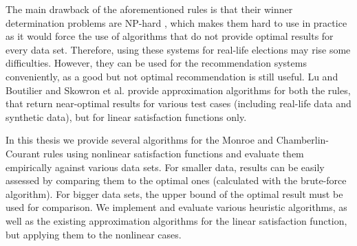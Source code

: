 The main drawback of the aforementioned rules is that their winner determination problems are NP-hard \cite{3, 4, 2}, which makes them hard to use in practice as it would force the use of algorithms that do not provide optimal results for every data set. Therefore, using these systems for real-life elections may rise some difficulties. However, they can be used for the recommendation systems conveniently, as a good but not optimal recommendation is still useful. Lu and Boutilier \cite{4} and Skowron et al. \cite{1} provide approximation algorithms for both the rules, that return near-optimal results for various test cases (including real-life data and synthetic data), but for linear satisfaction functions only.

In this thesis we provide several algorithms for the Monroe and Chamberlin-Courant rules using nonlinear satisfaction functions and evaluate them empirically against various data sets. For smaller data, results can be easily assessed by comparing them to the optimal ones (calculated with the brute-force algorithm). For bigger data sets, the upper bound of the optimal result must be used for comparison. We implement and evaluate various heuristic algorithms, as well as the existing approximation algorithms for the linear satisfaction function, but applying them to the nonlinear cases.
